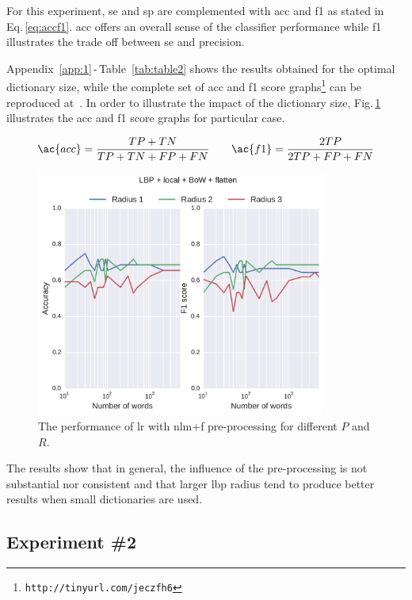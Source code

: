 For this experiment, \ac{se} and \ac{sp} are complemented with \ac{acc} and \ac{f1} as stated in Eq.\,\ref{eq:accf1}.
\ac{acc} offers an overall sense of the classifier performance while \ac{f1} illustrates the trade off between \ac{se} and precision.

Appendix~\ref{app:1}\,-\,Table~\ref{tab:table2} shows the results obtained for
the optimal dictionary size, while the complete set of \ac{acc} and \ac{f1}
score graphs\footnote{\texttt{http://tinyurl.com/jeczfh6}} can be reproduced
at~\cite{Lemaitre2015}.  In order to illustrate the impact of the dictionary
size, Fig.\,\ref{fig:RBOW} illustrates the \ac{acc} and \ac{f1} score graphs
for  particular case.

\begin{align}
\ac{acc} = \frac{TP+TN}{TP+TN+FP+FN} \qquad \ac{f1} = \frac{2TP}{2TP +FP+FN}
\label{eq:accf1}
\end{align}

\begin{figure}
\centering
\includegraphics[width=0.85\textwidth]{figure2}
\caption{The performance of \ac{lr} with \ac{nlm}+\ac{f} pre-processing for different $P$ and $R$.}
\label{fig:RBOW}
\end{figure}

The results show that in general, the influence of the pre-processing is not
substantial nor consistent and that larger \ac{lbp} radius tend to produce
better results when small dictionaries are used.

\subsection{Experiment \#2}\label{subsec:exp2}
%
%
%
%

